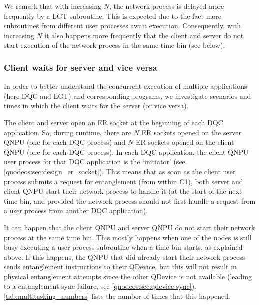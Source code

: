 We remark that with increasing $N$, the network process is delayed more frequently by a \ac{LGT} subroutine. This is expected due to the fact more subroutines from different user processes await execution. Consequently, with increasing $N$ it also happens more frequently that the client and server do not start execution of the network process in the same time-bin (see below).

\subsubsection{Client waits for server and vice versa}

In order to better understand the concurrent execution of multiple applications (here \ac{DQC} and \ac{LGT}) and corresponding programs, we investigate scenarios and times in which the client waits for the server (or vice versa). 

The client and server open an \ac{ER} socket at the beginning of each \ac{DQC} application. So, during runtime, there are $N$ \ac{ER} sockets opened on the server \ac{QNPU} (one for each \ac{DQC} process) and $N$ \ac{ER} sockets opened on the client \ac{QNPU} (one for each \ac{DQC} process). In each \ac{DQC} application, the client \ac{QNPU} user process for that \ac{DQC} application is the `initiator' (see \cref{qnodeos:sec:design_er_socket}). This means that as soon as the client user process submits a request for entanglement (from within C1), both server and client \ac{QNPU} start their network process to handle it (at the start of the next time bin, and provided the network process should not first handle a request from a user process from another \ac{DQC} application).

It can happen that the client \ac{QNPU} and server \ac{QNPU} do not start their network process at the same time bin. This mostly happens when one of the nodes is still busy executing a user process subroutine when a time bin starts, as explained above. If this happens, the \ac{QNPU} that did already start their network process sends entanglement instructions to their \ac{QDevice}, but this will not result in physical entanglement attempts since the other \ac{QDevice} is not available (leading to a entanglement sync failure, see \cref{qnodeos:sec:qdevice-sync}). \cref{tab:multitasking_numbers} lists the number of times that this happened.

